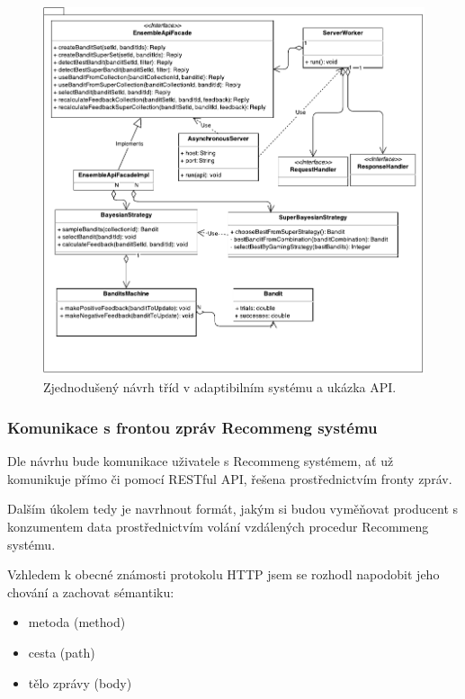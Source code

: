\documentclass[thesis=M,czech]{FITthesis}[2014/05/07]
\begin{document}
\begin{figure}\centering
	\includegraphics[width=1.0\textwidth]{obr/ensembleDiagram.pdf}
 	\caption[Zjednodušený návrh tříd v adaptibilním systému a ukázka API.]{Zjednodušený návrh tříd v adaptibilním systému a ukázka API.}\label{fig:recommengNavrh}
\end{figure}	

\subsubsection{Komunikace s frontou zpráv Recommeng systému}
\label{mess}
Dle návrhu bude komunikace uživatele s Recommeng systémem, ať už komunikuje přímo či pomocí RESTful API, řešena prostřednictvím fronty zpráv.

Dalším úkolem tedy je navrhnout formát, jakým si budou vyměňovat producent s konzumentem data prostřednictvím volání vzdálených procedur Recommeng systému.

Vzhledem k obecné známosti protokolu HTTP jsem se rozhodl napodobit jeho chování a zachovat sémantiku:

\begin{itemize}
	\item metoda (method)
	\item cesta (path)
	\item tělo zprávy (body)
\end{itemize}
\end{document}
